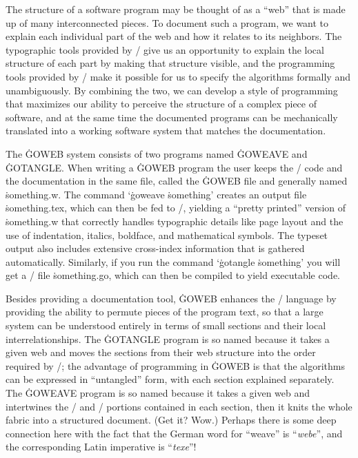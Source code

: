 The structure of a software program may be thought of as a ``web'' that is
made up of many interconnected pieces. To document such a program, we want
to explain each individual part of the web and how it relates to its
neighbors. The typographic tools provided by \TEX/ give us an opportunity
to explain the local structure of each part by making that structure
visible, and the programming tools provided by \GO/ make it possible
for us to specify the algorithms formally and unambiguously. By combining
the two, we can develop a style of programming that maximizes our ability
to perceive the structure of a complex piece of software, and at the same
time the documented programs can be mechanically translated into a working
software system that matches the documentation.

The \.{GOWEB} system consists of two programs named \.{GOWEAVE} and \.{GOTANGLE}.
When writing a \.{GOWEB} program the user keeps the
\GO/ code and the documentation in the same file, called the \.{GOWEB}
file and generally named \.{something.w}.  The command
`\.{goweave} \.{something}' creates an output file \.{something.tex}, which
can then be fed to \TEX/, yielding a ``pretty printed'' version of
\.{something.w} that correctly handles
typographic details like page layout and the use of indentation,
italics, boldface, and mathematical symbols. The typeset output also
includes extensive cross-index
information that is gathered automatically.  Similarly, if you run the
command `\.{gotangle} \.{something}' you will get a \GO/ file \.{something.go},
which can then be compiled to yield executable code.

Besides providing a documentation tool, \.{GOWEB} enhances the \GO/
language by providing the
ability to permute pieces of the program text, so that a large system can
be understood entirely in terms of small sections and their local
interrelationships.  The \.{GOTANGLE} program is so named because it takes a
given web and moves the sections from their web structure into the order
required by \GO/; the advantage of programming in \.{GOWEB} is that the
algorithms can be expressed in ``untangled'' form, with each section
explained separately.  The \.{GOWEAVE} program is so named because it takes
a given web and intertwines the \TEX/ and \GO/ portions contained in
each section, then it knits the whole fabric into a structured document.
(Get it? Wow.)  Perhaps there is some deep connection here with the fact
that the German word for ``weave'' is ``{\it webe\/}'', and the
corresponding Latin imperative is ``{\it texe\/}''!

